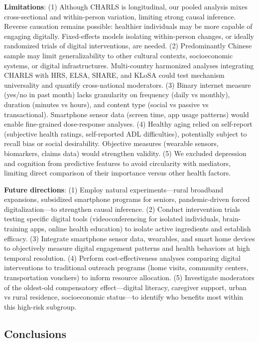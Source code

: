 \documentclass[10pt]{article}
\begin{document}
\textbf{Limitations}: (1) Although CHARLS is longitudinal, our pooled analysis mixes cross-sectional and within-person variation, limiting strong causal inference. Reverse causation remains possible: healthier individuals may be more capable of engaging digitally. Fixed-effects models isolating within-person changes, or ideally randomized trials of digital interventions, are needed. (2) Predominantly Chinese sample may limit generalizability to other cultural contexts, socioeconomic systems, or digital infrastructures. Multi-country harmonized analyses integrating CHARLS with HRS, ELSA, SHARE, and KLoSA could test mechanism universality and quantify cross-national moderators. (3) Binary internet measure (yes/no in past month) lacks granularity on frequency (daily vs monthly), duration (minutes vs hours), and content type (social vs passive vs transactional). Smartphone sensor data (screen time, app usage patterns) would enable fine-grained dose-response analyses. (4) Healthy aging relied on self-report (subjective health ratings, self-reported ADL difficulties), potentially subject to recall bias or social desirability. Objective measures (wearable sensors, biomarkers, claims data) would strengthen validity. (5) We excluded depression and cognition from predictive features to avoid circularity with mediators, limiting direct comparison of their importance versus other health factors.

\textbf{Future directions}: (1) Employ natural experiments---rural broadband expansions, subsidized smartphone programs for seniors, pandemic-driven forced digitalization---to strengthen causal inference. (2) Conduct intervention trials testing specific digital tools (videoconferencing for isolated individuals, brain-training apps, online health education) to isolate active ingredients and establish efficacy. (3) Integrate smartphone sensor data, wearables, and smart home devices to objectively measure digital engagement patterns and health behaviors at high temporal resolution. (4) Perform cost-effectiveness analyses comparing digital interventions to traditional outreach programs (home visits, community centers, transportation vouchers) to inform resource allocation. (5) Investigate moderators of the oldest-old compensatory effect---digital literacy, caregiver support, urban vs rural residence, socioeconomic status---to identify who benefits most within this high-risk subgroup.

\subsection*{Conclusions}
\end{document}
